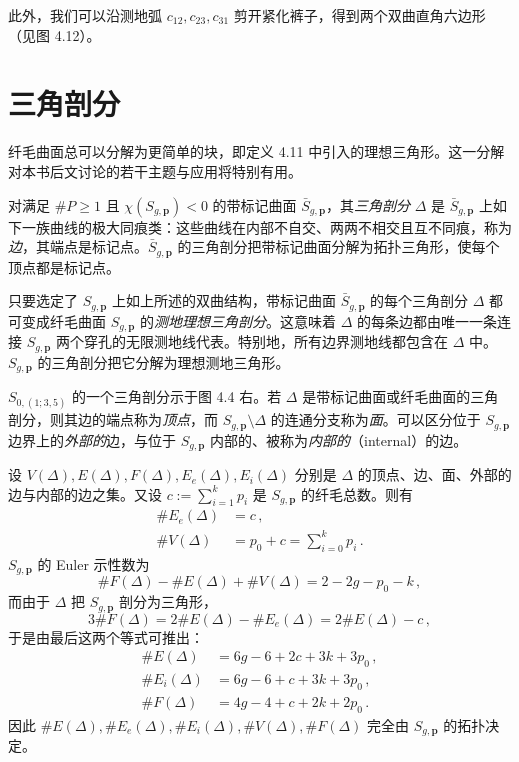 此外，我们可以沿测地弧 $c_{12},c_{23},c_{31}$ 剪开紧化裤子，得到两个双曲直角六边形（见图 4.12）。


\section{三角剖分}

纤毛曲面总可以分解为更简单的块，即定义 4.11 中引入的理想三角形。这一分解对本书后文讨论的若干主题与应用将特别有用。

\begin{definition}[4.16]
对满足 $\#P\ge 1$ 且 $\chi(S_{g,\mathbf p})<0$ 的带标记曲面 $\bar S_{g,\mathbf p}$，其\emph{三角剖分} $\Delta$ 是 $\bar S_{g,\mathbf p}$ 上如下一族曲线的极大同痕类：这些曲线在内部不自交、两两不相交且互不同痕，称为\emph{边}，其端点是标记点。$\bar S_{g,\mathbf p}$ 的三角剖分把带标记曲面分解为拓扑三角形，使每个顶点都是标记点。
\end{definition}

只要选定了 $S_{g,\mathbf p}$ 上如上所述的双曲结构，带标记曲面 $\bar S_{g,\mathbf p}$ 的每个三角剖分 $\Delta$ 都可变成纤毛曲面 $S_{g,\mathbf p}$ 的\emph{测地理想三角剖分}。这意味着 $\Delta$ 的每条边都由唯一一条连接 $S_{g,\mathbf p}$ 两个穿孔的无限测地线代表。特别地，所有边界测地线都包含在 $\Delta$ 中。$S_{g,\mathbf p}$ 的三角剖分把它分解为理想测地三角形。

$S_{0,(1;3,5)}$ 的一个三角剖分示于图 4.4 右。若 $\Delta$ 是带标记曲面或纤毛曲面的三角剖分，则其边的端点称为\emph{顶点}，而 $S_{g,\mathbf p}\setminus\Delta$ 的连通分支称为\emph{面}。可以区分位于 $S_{g,\mathbf p}$ 边界上的\emph{外部的}边，与位于 $S_{g,\mathbf p}$ 内部的、被称为\emph{内部的}（internal）的边。

设 $V(\Delta),E(\Delta),F(\Delta),E_e(\Delta),E_i(\Delta)$ 分别是 $\Delta$ 的顶点、边、面、外部的边与内部的边之集。又设 $c:=\sum_{i=1}^{k}p_i$ 是 $S_{g,\mathbf p}$ 的纤毛总数。则有
\[
\begin{aligned}
\#E_e(\Delta)&=c\,,\\
\#V(\Delta)&=p_0+c=\sum_{i=0}^{k}p_i\,.
\end{aligned}
\]
$S_{g,\mathbf p}$ 的 Euler 示性数为
\[
\#F(\Delta)-\#E(\Delta)+\#V(\Delta)=2-2g-p_0-k\,,
\]
而由于 $\Delta$ 把 $S_{g,\mathbf p}$ 剖分为三角形，
\[
3\#F(\Delta)=2\#E(\Delta)-\#E_e(\Delta)=2\#E(\Delta)-c\,,
\]
于是由最后这两个等式可推出：
\[
\begin{aligned}
\#E(\Delta)&=6g-6+2c+3k+3p_0\,,\\
\#E_i(\Delta)&=6g-6+c+3k+3p_0\,,\\
\#F(\Delta)&=4g-4+c+2k+2p_0\,.
\end{aligned}
\]
因此 $\#E(\Delta),\#E_e(\Delta),\#E_i(\Delta),\#V(\Delta),\#F(\Delta)$ 完全由 $S_{g,\mathbf p}$ 的拓扑决定。

